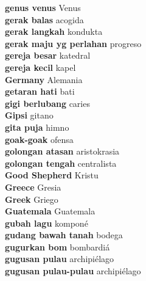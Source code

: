\textbf{ genus venus  } Venus \\
\textbf{ gerak balas  } acogida \\
\textbf{ gerak langkah  } kondukta \\
\textbf{ gerak maju yg perlahan  } progreso \\
\textbf{ gereja besar  } katedral \\
\textbf{ gereja kecil  } kapel \\
\textbf{ Germany  } Alemania \\
\textbf{ getaran hati  } bati \\
\textbf{ gigi berlubang  } caries \\
\textbf{ Gipsi  } gitano \\
\textbf{ gita puja  } himno \\
\textbf{ goak-goak  } ofensa \\
\textbf{ golongan atasan  } aristokrasia \\
\textbf{ golongan tengah  } centralista \\
\textbf{ Good Shepherd  } Kristu \\
\textbf{ Greece  } Gresia \\
\textbf{ Greek  } Griego \\
\textbf{ Guatemala  } Guatemala \\
\textbf{ gubah lagu  } komponé \\
\textbf{ gudang bawah tanah  } bodega \\
\textbf{ gugurkan bom  } bombardiá \\
\textbf{ gugusan pulau  } archipiélago \\
\textbf{ gugusan pulau-pulau  } archipiélago \\
